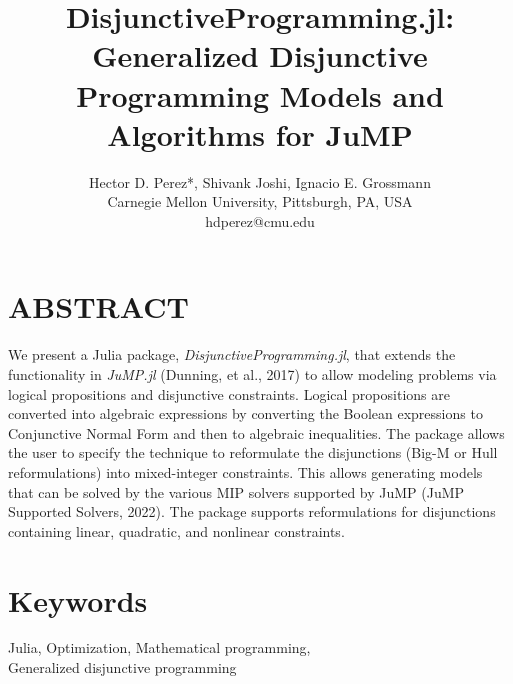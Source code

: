 \documentclass{juliacon}
\begin{document}
\title{DisjunctiveProgramming.jl: Generalized Disjunctive Programming Models and Algorithms for JuMP}
\author{
  \large Hector D. Perez*, Shivank Joshi, Ignacio E. Grossmann
  \\\normalsize Carnegie Mellon University, Pittsburgh, PA, USA  
  \\\normalsize	*hdperez@cmu.edu
}

\maketitle


\section*{ABSTRACT}
We present a Julia package, \textit{DisjunctiveProgramming.jl}, that extends the functionality in \textit{JuMP.jl} (Dunning, et al., 2017) to allow modeling problems via logical propositions and disjunctive constraints. Logical propositions are converted into algebraic expressions by converting the Boolean expressions to Conjunctive Normal Form and then to algebraic inequalities. The package allows the user to specify the technique to reformulate the disjunctions (Big-M or Hull reformulations) into mixed-integer constraints. This allows generating models that can be solved by the various MIP solvers supported by JuMP (JuMP Supported Solvers, 2022). The package supports reformulations for disjunctions containing linear, quadratic, and nonlinear constraints.

\section*{Keywords}
Julia, Optimization, Mathematical programming, \\ Generalized disjunctive programming
\end{document}
